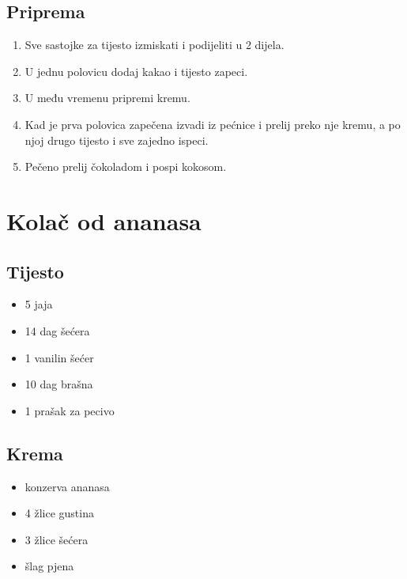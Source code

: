 \documentclass{article}
\begin{document}
\subsection{Priprema}
\begin{enumerate}
  \item Sve sastojke za tijesto izmiskati i podijeliti u 2 dijela.
  \item U jednu polovicu dodaj kakao i tijesto zapeci.
  \item U među vremenu pripremi kremu.
  \item Kad je prva polovica zapečena izvadi iz pećnice i prelij preko nje kremu, a po njoj drugo tijesto i sve zajedno ispeci.
  \item Pečeno prelij čokoladom i pospi kokosom.
\end{enumerate}


\section{Kolač od ananasa}
\subsection{Tijesto}
\begin{itemize}
  \item 5 jaja
  \item 14 dag šećera
  \item 1 vanilin šećer
  \item 10 dag brašna
  \item 1 prašak za pecivo
\end{itemize}

\subsection{Krema}
\begin{itemize}
  \item konzerva ananasa
  \item 4 žlice gustina
  \item 3 žlice šećera
  \item šlag pjena
\end{itemize}
\end{document}
